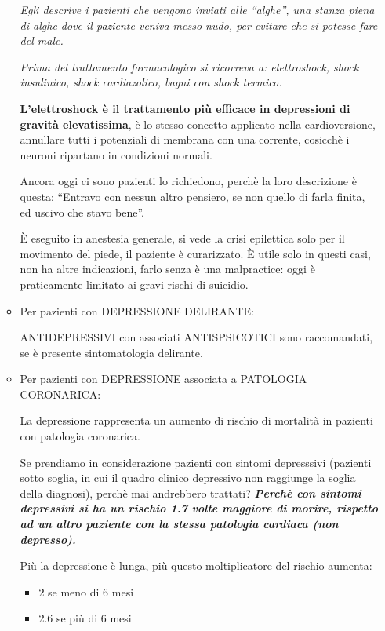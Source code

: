 \begin{itemize}
\begin{itemize}
  \emph{Egli descrive i pazienti che vengono inviati alle ``alghe'', una
  stanza piena di alghe dove il paziente veniva messo nudo, per evitare
  che si potesse fare del male.}

  \emph{Prima del trattamento farmacologico si ricorreva a:
  elettroshock, shock insulinico, shock cardiazolico, bagni con shock
  termico.}

  \textbf{L'elettroshock è il trattamento più efficace in depressioni di
  gravità elevatissima}, è lo stesso concetto applicato nella
  cardioversione, annullare tutti i potenziali di membrana con una
  corrente, cosicchè i neuroni ripartano in condizioni normali.

  Ancora oggi ci sono pazienti lo richiedono, perchè la loro descrizione
  è questa: ``Entravo con nessun altro pensiero, se non quello di farla
  finita, ed uscivo che stavo bene''.

  È eseguito in anestesia generale, si vede la crisi epilettica solo per
  il movimento del piede, il paziente è curarizzato. È utile solo in
  questi casi, non ha altre indicazioni, farlo senza è una malpractice:
  oggi è praticamente limitato ai gravi rischi di suicidio.

\item
  Per pazienti con DEPRESSIONE DELIRANTE:

  ANTIDEPRESSIVI con associati ANTISPSICOTICI sono raccomandati, se è
  presente sintomatologia delirante.


\item
  Per pazienti con DEPRESSIONE associata a PATOLOGIA CORONARICA:

  La depressione rappresenta un aumento di rischio di mortalità in
  pazienti con patologia coronarica.

  Se prendiamo in considerazione pazienti con sintomi depresssivi
  (pazienti sotto soglia, in cui il quadro clinico depressivo non
  raggiunge la soglia della diagnosi), perchè mai andrebbero trattati?
  \textbf{\emph{Perchè con sintomi depressivi si ha un rischio 1.7 volte
  maggiore di morire, rispetto ad un altro paziente con la stessa
  patologia cardiaca (non depresso).}}

  Più la depressione è lunga, più questo moltiplicatore del rischio
  aumenta:
\begin{itemize}
\item
  2 se meno di 6 mesi
\item
2.6 se più di 6 mesi
\end{itemize}


\end{itemize}
\end{itemize}
